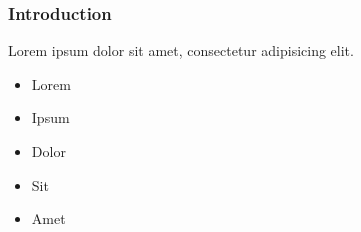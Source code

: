 \begin{frame}
	\frametitle{Introduction}
	Lorem ipsum dolor sit amet, consectetur adipisicing elit.

	\begin{itemize}
	    \item<1-> Lorem
	    \item<2-> Ipsum
	    \item<3> Dolor
	    \item<4-> Sit
	    \item<5-> Amet
	\end{itemize}
\end{frame}